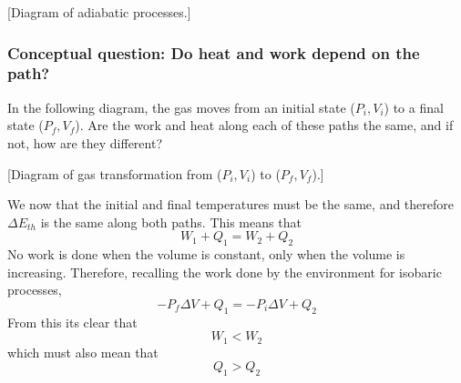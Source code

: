 [Diagram of adiabatic processes.]\nopagebreak
\vspace{5cm}

\subsubsection{Conceptual question: Do heat and work depend on the path?}
In the following diagram, the gas moves from an initial state ($P_i,V_i$) to a final state ($P_f,V_f$). Are the work and heat along each of these paths the same, and if not, how are they different?

[Diagram of gas transformation from ($P_i,V_i$) to ($P_f,V_f$).]\nopagebreak
\vspace{5cm}

We now that the initial and final temperatures must be the same, and therefore $\Delta E_{th}$ is the same along both paths. This means that
$$W_1+Q_1=W_2+Q_2$$
No work is done when the volume is constant, only when the volume is increasing. Therefore, recalling the work done by the environment for isobaric processes,
$$-P_f\Delta V + Q_1 = -P_i\Delta V + Q_2$$
From this its clear that
$$W_1<W_2$$
which must also mean that
$$Q_1>Q_2$$



\clearpage
